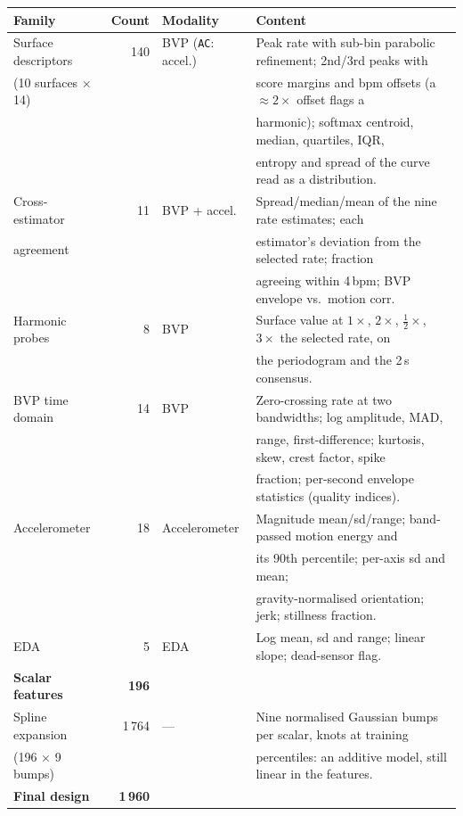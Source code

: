 \documentclass[10pt,a4paper]{article}
\newcommand{\feat}[1]{\texttt{\small #1}}
\begin{document}
\begin{table}[h]
\centering\footnotesize
\begin{tabular}{@{}lrll@{}}
\toprule
\textbf{Family} & \textbf{Count} & \textbf{Modality} & \textbf{Content} \\
\midrule
Surface descriptors & 140 & BVP (\feat{AC}: accel.) &
  Peak rate with sub-bin parabolic refinement; 2nd/3rd peaks with \\
(10 surfaces $\times$ 14) & & &
  score margins and bpm offsets (a $\approx\!2\times$ offset flags a \\
 & & & harmonic); softmax centroid, median, quartiles, IQR, \\
 & & & entropy and spread of the curve read as a distribution. \\
\addlinespace
Cross-estimator & 11 & BVP + accel. &
  Spread/median/mean of the nine rate estimates; each \\
agreement & & & estimator's deviation from the selected rate; fraction \\
 & & & agreeing within 4\,bpm; BVP envelope vs.\ motion corr. \\
\addlinespace
Harmonic probes & 8 & BVP &
  Surface value at $1\times$, $2\times$, $\tfrac12\times$, $3\times$ the selected rate, on \\
 & & & the periodogram and the 2\,s consensus. \\
\addlinespace
BVP time domain & 14 & BVP &
  Zero-crossing rate at two bandwidths; log amplitude, MAD, \\
 & & & range, first-difference; kurtosis, skew, crest factor, spike \\
 & & & fraction; per-second envelope statistics (quality indices). \\
\addlinespace
Accelerometer & 18 & Accelerometer &
  Magnitude mean/sd/range; band-passed motion energy and \\
 & & & its 90th percentile; per-axis sd and mean; \\
 & & & gravity-normalised orientation; jerk; stillness fraction. \\
\addlinespace
EDA & 5 & EDA &
  Log mean, sd and range; linear slope; dead-sensor flag. \\
\midrule
\textbf{Scalar features} & \textbf{196} & & \\
Spline expansion & 1\,764 & --- &
  Nine normalised Gaussian bumps per scalar, knots at training \\
(196 $\times$ 9 bumps) & & & percentiles: an additive model, still linear in the features. \\
\midrule
\textbf{Final design} & \textbf{1\,960} & & \\
\bottomrule
\end{tabular}
\end{table}
\end{document}
